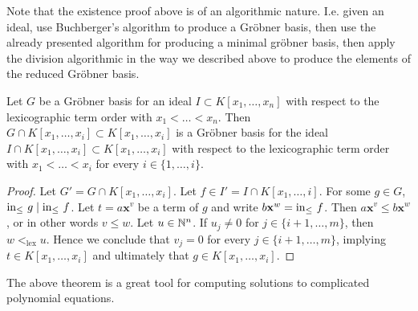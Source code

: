 \begin{remark}
    Note that the existence proof above is of an algorithmic nature. I.e. given an ideal, use Buchberger's algorithm to produce a Gröbner basis, then use the already presented algorithm for producing a minimal gröbner basis, then apply the division algorithmic in the way we described above to produce the elements of the reduced Gröbner basis. 
\end{remark}
\begin{theorem}\label{GBElimTheorem}
    Let $G$ be a Gröbner basis for an ideal $I\subset K[x_1,\dots,x_n]$ with respect to the lexicographic term order with $x_1<\dots<x_n$. Then $G\cap K[x_1,\dots,x_i]\subset K[x_1,\dots,x_i]$ is a Gröbner basis for the ideal $I\cap K[x_1,\dots,x_i]\subset K[x_1,\dots,x_i]$ with respect to the lexicographic term order with $x_1<\dots< x_i$ for every $i\in\{1,\dots,i\}$.
\end{theorem}
\begin{proof}
    Let $G'=G\cap K[x_1,\dots,x_i]$. Let $f\in I' = I\cap K[x_1,\dots,i]$.  For some $g\in G$, $\mathrm{in}_\leq\ g \mid \mathrm{in}_\leq \ f$. Let $t=a\mathbf{x}^v$ be a term of $g$ and write $b\mathbf{x}^w = \mathrm{in}_\leq\ f$. Then 
    $a\mathbf{x}^v\leq b\mathbf{x}^w$, or in other words $v \leq w$. Let $u\in \mathbb{N}^n$. If $u_j \neq 0$ for $j\in\{i+1,\dots,m\}$, then $w<_\text{lex} u$. Hence we conclude that $v_j = 0$ for every $j\in\{i+1,\dots,m\}$, implying $t\in K[x_1,\dots,x_i]$ and ultimately that $g\in K[x_1,\dots,x_i]$.
\end{proof}
The above theorem is a great tool for computing solutions to complicated polynomial equations. 
